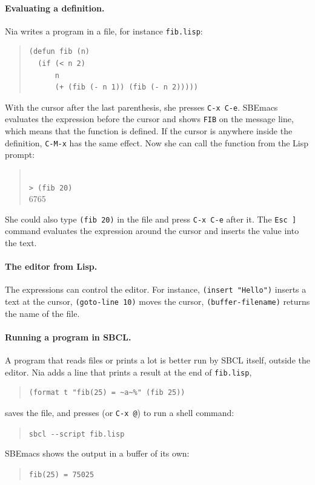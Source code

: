 \documentclass[a4paper,12pt,openany]{book}
\begin{document}
\paragraph{Evaluating a definition.} Nia writes a program in a
file, for instance \verb|fib.lisp|:
\begin{quote}
\begin{verbatim}
(defun fib (n)
  (if (< n 2)
      n
      (+ (fib (- n 1)) (fib (- n 2)))))
\end{verbatim}
\end{quote}
With the cursor after the last parenthesis, she presses
\verb|C-x C-e|. SBEmacs evaluates the expression before the cursor
and shows \verb|FIB| on the message line, which means that
the function is defined. If the cursor is anywhere inside the
definition, \verb|C-M-x| has the same effect. Now she can call
the function from the Lisp prompt:
\begin{quote}
\keys{:}\\
\verb|> (fib 20)|\\
6765
\end{quote}
She could also type \verb|(fib 20)| in the file and press \verb|C-x C-e|
after it. The \verb|Esc ]| command evaluates the expression
around the cursor and inserts the value into the text.

\paragraph{The editor from Lisp.} The expressions can control the
editor. For instance, \verb|(insert "Hello")| inserts a text at the
cursor, \verb|(goto-line 10)| moves the cursor, \verb|(buffer-filename)|
returns the name of the file.

\paragraph{Running a program in SBCL.} A program that reads files
or prints a lot is better run by SBCL itself, outside the editor.
Nia adds a line that prints a result at the end of \verb|fib.lisp|,
\begin{quote}
\begin{verbatim}
(format t "fib(25) = ~a~%" (fib 25))
\end{verbatim}
\end{quote}
saves the file, and presses \keys{!} (or \verb|C-x @|) to
run a shell command:
\begin{quote}
\verb|sbcl --script fib.lisp|
\end{quote}
SBEmacs shows the output in a buffer of its own:
\begin{quote}
\verb|fib(25) = 75025|
\end{quote}
\end{document}
